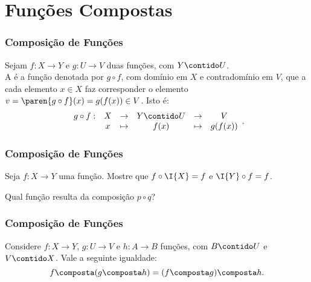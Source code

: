 \section{Funções Compostas}
\begin{frame}
\frametitle{Composição de Funções} 

\begin{definicao}
Sejam $f: X \to Y$ e $g: U \to V$ duas funções, com $Y \contido U$.\\
A  é a função denotada por $g
\circ f$, com domínio em $X$ e contradomínio em $V$, que a cada
elemento $x \in X$ faz corresponder o elemento $v = \paren{g \circ
f}(x) = g(f(x)) \in V$. Isto é:
$$\begin{array}{cccccc}
g \circ f : & X & \to     & Y \contido U & \to & V \\
		 &  x & \mapsto & f(x) & \mapsto & g(f(x))
\end{array}.$$
\end{definicao}

\end{frame}


\begin{frame}
\frametitle{Composição de Funções} 

\begin{exemplo}
Seja $f: X \to Y$ uma função. Mostre que $f \circ \I{X} = f$ e $\I{Y}
\circ f = f$.
\end{exemplo}\pause

\begin{exemplo}
Qual função resulta da composição $p \circ q$?
\end{exemplo}
\end{frame}




\begin{frame}
\frametitle{Composição de Funções} 


\begin{proposicao}
	Considere $f: X \to Y$, $g: U \to V$ e $h: A \to B$ funções, com $B \contido U$ e $V \contido X$. Vale a seguinte igualdade:
	$$f \composta (g \composta h) = (f \composta g) \composta h.$$
\end{proposicao}

\end{frame}

